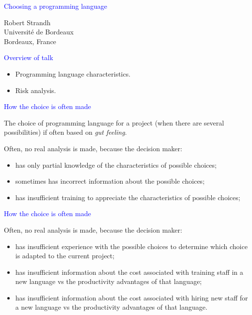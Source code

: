 \documentclass{slides}
\newcommand{\ti}[1]{\begin{center}\Large{\textcolor{blue}{#1}}\end{center}}
\begin{document}
\landscape
\setlength{\oddsidemargin}{1cm}
\setlength{\evensidemargin}{1cm}
\setlength{\marginparwidth}{1cm}
\setlength{\parskip}{0.5cm}
\setlength{\parindent}{0cm}
\begin{slide}\ti{Choosing a programming language}
\vskip 0.5cm
\begin{center}
Robert Strandh \\
Université de Bordeaux \\
Bordeaux, France
\end{center}
\vfill\end{slide}
\begin{slide}\ti{Overview of talk}

  \begin{itemize}
  \item Programming language characteristics.
  \item Risk analysis.
  \end{itemize}

\vfill\end{slide}
\begin{slide}\ti{How the choice is often made}

The choice of programming language for a project (when there are
several possibilities) if often based on \emph{gut feeling}.

Often, no real analysis is made, because the decision maker:

\begin{itemize}
\item has only partial knowledge of the characteristics of possible
  choices;
\item sometimes has incorrect information about the possible choices;
\item has insufficient training to appreciate the characteristics of
  possible choices;
\end{itemize}

\vfill\end{slide}
\begin{slide}\ti{How the choice is often made}

Often, no real analysis is made, because the decision maker:

\begin{itemize}
\item has insufficient experience with the possible choices to
  determine which choice is adapted to the current project;
\item has insufficient information about the cost associated with
  training staff in a new language vs the productivity advantages of
  that language;
\item has insufficient information about the cost associated with
  hiring new staff for a new language vs the productivity advantages of
  that language.
\end{itemize}

\vfill\end{slide}
\end{document}
